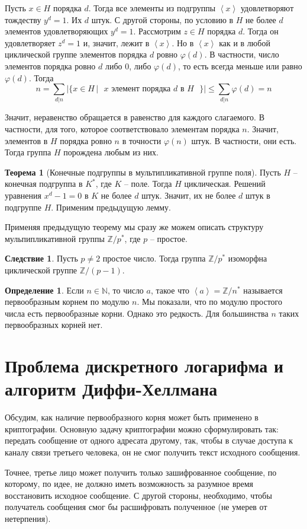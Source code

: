 \documentclass[10pt,a4paper,oneside]{book}
\theoremstyle{definition}
\newtheorem*{defn}{\color{yellow!30!red} Определение}
\newtheorem{thm}{\color{red!40!black}Теорема}
\newtheorem{cor}{\color{green!45!black}Следствие}
\renewcommand{\leq}{\leqslant}
\newcommand{\mb}[1]{\mathbb{#1}}
\def\ffi{\varphi}
\def\lan{\left\langle }
\def\ran{\right\rangle}
\def\thrm{\begin{thm}}
\def\ethrm{\end{thm}}
\def\dfn{\begin{defn}}
\def\edfn{\end{defn}}
\def\crl{\begin{cor}}
\def\ecrl{\end{cor}}
\begin{document}
Пусть  $x\in H$ порядка $d$. Тогда все элементы из подгруппы $\lan x \ran$ удовлетворяют тождеству $y^d=1$. Их $d$ штук. С другой стороны, по условию в $H$ не более $d$ элементов удовлетворяющих $y^d=1$. Рассмотрим $z \in H$ порядка $d$. Тогда он удовлетворяет $z^d=1$ и, значит, лежит в $\lan x \ran$. Но в $\lan x \ran$ как и в любой циклической группе элементов порядка $d$ ровно $\ffi(d)$. В частности, число элементов порядка ровно $d$ либо $0$, либо $\varphi(d)$, то есть всегда меньше или равно $\varphi(d)$. Тогда
$$n = \sum_{d|n} |\{x \in H \,| \text{  $x$ элемент порядка $d$ в $H$ } \}|\leq \sum_{d|n}\varphi(d) =n$$

Значит, неравенство обращается в равенство для каждого слагаемого. В частности, для того, которое соответствовало элементам порядка $n$. Значит, элементов в $H$ порядка ровно $n$ в точности $\varphi(n)$ штук. В частности, они
есть. Тогда группа $H$ порождена любым из них.\endproof


\thrm[Конечные подгруппы в мультипликативной группе поля] Пусть $H$ -- конечная подгруппа в $K^*$, где $K$ -- поле. Тогда $H$ циклическая.
\proof Решений уравнения $x^d-1 = 0$ в $K$ не более $d$ штук. Значит, их не более $d$ штук в подгруппе $H$. Применим предыдущую лемму.
\endproof
\ethrm

Применяя предыдущую теорему мы сразу же можем описать структуру мульпипликативной группы $\mb Z/ p^*$, где $p$ -- простое.

\crl Пусть $p\neq 2$ простое число. Тогда группа $\mb Z/p^*$ изоморфна циклической группе $\mb Z/(p-1)$.
\ecrl

\dfn Если $n\in \mb N$, то число $a$, такое что $\lan a\ran =\mb Z/n^*$ называется первообразным корнем по модулю $n$. Мы показали, что по модулю простого числа есть первообразные корни. Однако это редкость. Для большинства $n$ таких первообразных корней нет.  
\edfn


\section{Проблема дискретного логарифма и алгоритм Диффи-Хеллмана}

Обсудим, как наличие первообразного корня может быть  применено в криптографии. Основную задачу криптографии можно сформулировать так: передать сообщение от одного адресата другому, так, чтобы в случае доступа к каналу связи третьего человека, он не смог получить текст исходного сообщения. 

Точнее, третье лицо может получить только зашифрованное сообщение, по которому, по идее, не должно иметь возможность за разумное время восстановить исходное сообщение. С другой стороны, необходимо, чтобы получатель сообщения смог бы расшифровать полученное (не умерев от нетерпения).
\end{document}
